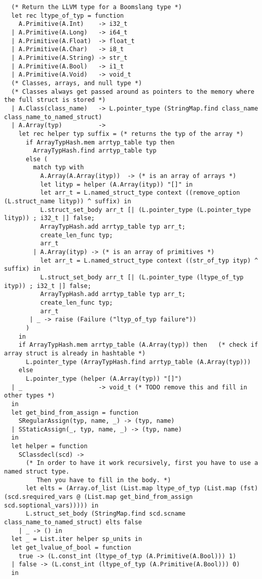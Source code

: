 \documentclass{article}
\begin{document}
\begin{verbatim}
  (* Return the LLVM type for a Boomslang type *)
  let rec ltype_of_typ = function
    A.Primitive(A.Int)    -> i32_t
  | A.Primitive(A.Long)   -> i64_t
  | A.Primitive(A.Float)  -> float_t
  | A.Primitive(A.Char)   -> i8_t
  | A.Primitive(A.String) -> str_t
  | A.Primitive(A.Bool)   -> i1_t
  | A.Primitive(A.Void)   -> void_t
  (* Classes, arrays, and null type *)
  (* Classes always get passed around as pointers to the memory where the full struct is stored *)
  | A.Class(class_name)   -> L.pointer_type (StringMap.find class_name class_name_to_named_struct)
  | A.Array(typ)          -> 
    let rec helper typ suffix = (* returns the typ of the array *)
      if ArrayTypHash.mem arrtyp_table typ then
        ArrayTypHash.find arrtyp_table typ 
      else (
        match typ with 
          A.Array(A.Array(ityp))  -> (* is an array of arrays *)
          let lityp = helper (A.Array(ityp)) "[]" in
          let arr_t = L.named_struct_type context ((remove_option (L.struct_name lityp)) ^ suffix) in
          L.struct_set_body arr_t [| (L.pointer_type (L.pointer_type lityp)) ; i32_t |] false;
          ArrayTypHash.add arrtyp_table typ arr_t;
          create_len_func typ;
          arr_t
        | A.Array(ityp) -> (* is an array of primitives *)
          let arr_t = L.named_struct_type context ((str_of_typ ityp) ^ suffix) in
          L.struct_set_body arr_t [| (L.pointer_type (ltype_of_typ ityp)) ; i32_t |] false;
          ArrayTypHash.add arrtyp_table typ arr_t;
          create_len_func typ;
          arr_t
       | _ -> raise (Failure ("ltyp_of_typ failure"))
      ) 
    in 
    if ArrayTypHash.mem arrtyp_table (A.Array(typ)) then   (* check if array struct is already in hashtable *)
      L.pointer_type (ArrayTypHash.find arrtyp_table (A.Array(typ))) 
    else 
      L.pointer_type (helper (A.Array(typ)) "[]")
  | _                     -> void_t (* TODO remove this and fill in other types *)
  in
  let get_bind_from_assign = function
    SRegularAssign(typ, name, _) -> (typ, name)
  | SStaticAssign(_, typ, name, _) -> (typ, name)
  in
  let helper = function
    SClassdecl(scd) ->
      (* In order to have it work recursively, first you have to use a named struct type.
         Then you have to fill in the body. *)
      let elts = (Array.of_list (List.map ltype_of_typ (List.map (fst) (scd.srequired_vars @ (List.map get_bind_from_assign scd.soptional_vars))))) in
      L.struct_set_body (StringMap.find scd.scname class_name_to_named_struct) elts false
    | _ -> () in
  let _ = List.iter helper sp_units in
  let get_lvalue_of_bool = function
    true -> (L.const_int (ltype_of_typ (A.Primitive(A.Bool))) 1)
  | false -> (L.const_int (ltype_of_typ (A.Primitive(A.Bool))) 0)
  in


\end{verbatim}
\end{document}
